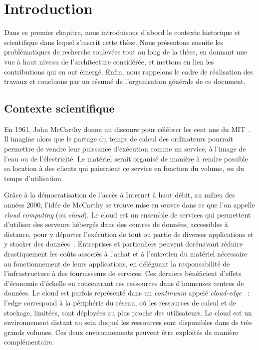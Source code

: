 \chapter{Introduction}
\label{chapter:introduction}

Dans ce premier chapitre, nous introduisons d'abord le contexte historique et scientifique dans lequel s'inscrit cette thèse. Nous présentons ensuite les problématiques de recherche soulevées tout au long de la thèse, en donnant une vue à haut niveau de l'architecture considérée, et mettons en lien les contributions qui en ont émergé. Enfin, nous rappelons le cadre de réalisation des travaux et concluons par un résumé de l'organisation générale de ce document.

\section{Contexte scientifique}

En 1961, John McCarthy donne un discours pour célébrer les cent ans du \gls{MIT}~\cite{greenberger1962management}. Il imagine alors que le partage du temps de calcul des ordinateurs pourrait permettre de vendre leur puissance d'exécution comme un service, à l'image de l'eau ou de l'électricité. Le matériel serait organisé de manière à rendre possible sa location à des clients qui paieraient ce service en fonction du volume, ou du temps d'utilisation.

Grâce à la démocratisation de l'accès à Internet à haut débit, au milieu des années 2000, l'idée de McCarthy se trouve mise en œuvre dans ce que l'on appelle \textit{cloud computing} (ou \textit{cloud}). Le cloud est un ensemble de services qui permettent d'utiliser des serveurs hébergés dans des centres de données, accessibles à distance, pour y déporter l'exécution de tout ou partie de diverses applications et y stocker des données~\cite{hayesCloudComputing2008}. Entreprises et particuliers peuvent dorénavant réduire drastiquement les coûts associés à l'achat et à l'entretien du matériel nécessaire au fonctionnement de leurs applications, en déléguant la responsabilité de l'infrastructure à des fournisseurs de services. Ces derniers bénéficient d'effets d'économie d'échelle en concentrant ces ressources dans d'immenses centres de données. Le cloud est parfois représenté dans un \textit{continuum} appelé \textit{cloud-edge}~\cite{jansenSPECRGReferenceArchitecture2023} : l'edge correspond à la périphérie du réseau, où les ressources de calcul et de stockage, limitées, sont déployées au plus proche des utilisateurs. Le cloud est un environnement distant au sein duquel les ressources sont disponibles dans de très grands volumes. Ces deux environnements peuvent être exploités de manière complémentaire.

